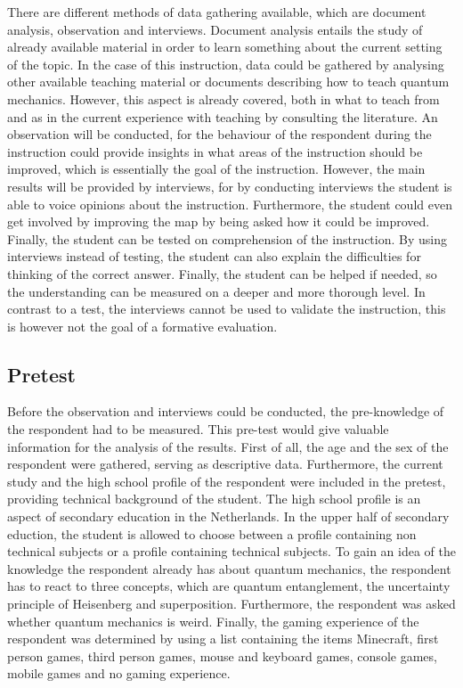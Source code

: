 \documentclass[11pt,twoside]{report} %
\begin{document}
There are different methods of data gathering available, which are document analysis, observation and interviews. Document analysis entails the study of already available material in order to learn something about the current setting of the topic. In the case of this instruction, data could be gathered by analysing other available teaching material or documents describing how to teach quantum mechanics. However, this aspect is already covered, both in what to teach from  and as in the current experience with teaching by consulting the literature. An observation will be conducted, for the behaviour of the respondent during the instruction could provide insights in what areas of the instruction should be improved, which is essentially the goal of the instruction. However, the main results will be provided by interviews, for by conducting interviews the student is able to voice opinions about the instruction. Furthermore, the student could even get involved by improving the map by being asked how it could be improved. Finally, the student can be tested on comprehension of the instruction. By using interviews instead of testing, the student can also explain the difficulties for thinking of the correct answer. Finally, the student can be helped if needed, so the understanding can be measured on a deeper and more thorough level. In contrast to a test, the interviews cannot be used to validate the instruction, this is however not the goal of a formative evaluation.

\subsection{Pretest}

Before the observation and interviews could be conducted, the pre-knowledge of the respondent had to be measured. This pre-test would give valuable information for the analysis of the results. First of all, the age and the sex of the respondent were gathered, serving as descriptive data. Furthermore, the current study and the high school profile of the respondent were included in the pretest, providing technical background of the student. The high school profile is an aspect of secondary education in the Netherlands. In the upper half of secondary eduction, the student is allowed to choose between a profile containing non technical subjects or a profile containing technical subjects. To gain an idea of the knowledge the respondent already has about quantum mechanics, the respondent has to react to three concepts, which are quantum entanglement, the uncertainty principle of Heisenberg and superposition. Furthermore, the respondent was asked whether quantum mechanics is weird. Finally, the gaming experience of the respondent was determined by using a list containing the items Minecraft, first person games, third person games, mouse and keyboard games, console games, mobile games and no gaming experience.
\end{document}
